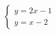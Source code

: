 $\displaystyle
\left\{
\begin{array}{l}
\displaystyle y = 2x - 1 \\
\displaystyle y = x - 2
\end{array}
\right.
$

